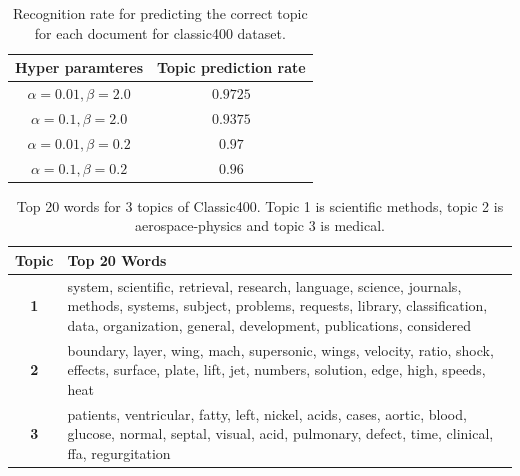 \documentclass[twoside,12pt]{article}
\begin{document}
\begin{table}[!]
\begin{center}
\begin{tabular}{| c | c |} 
\hline
\textbf{Hyper paramteres}& \textbf{Topic prediction rate}  \\ \hline

$\alpha=0.01,\beta=2.0$ & $0.9725$ \\ \hline
$\alpha=0.1,\beta=2.0$ &  $0.9375$ \\ \hline
$\alpha=0.01,\beta=0.2$ & $0.97$ \\ \hline
$\alpha=0.1,\beta=0.2$ & $0.96$ \\ \hline
 
\end{tabular}
\caption{Recognition rate for predicting the correct topic for each document for classic400 dataset.}
\label{tableClssicRecognition}
\end{center}
\end{table}

\begin{table}[h!]
\begin{center}
\begin{tabular}{| c | p{12cm} |}
\hline
\textbf{Topic}& \textbf{Top 20 Words}  \\ \hline
\textbf{1}&system, scientific, retrieval, research, language, science, journals,  methods, systems, subject, problems, requests, library, classification, data,  organization, general, development, publications, considered\\ \hline
\textbf{2}&boundary, layer, wing, mach, supersonic, wings, velocity, ratio, shock, effects, surface, plate, lift, jet, numbers, solution, edge, high, speeds, heat\\
 \hline
\textbf{3}&patients, ventricular, fatty, left, nickel, acids, cases, aortic, blood, glucose, normal, septal, visual, acid, pulmonary, defect, time, clinical, ffa, regurgitation\\
 \hline
 
\end{tabular}
\caption{Top 20 words for 3 topics of Classic400. Topic 1 is scientific methods, topic 2 is aerospace-physics and topic 3 is medical.}
\label{tableTopWordsClassic}
\end{center}
\end{table}
\end{document}
